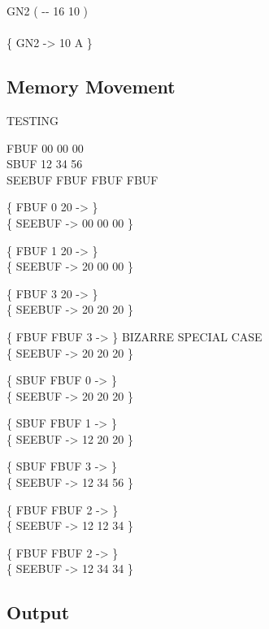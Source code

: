 \begin{tt}
\word{:} GN2	 ( -{}- 16 10 ) \\
\tab {}  
	  
	  
	  \word{!} \word{;} \\
\{ GN2 -> 10 A \}
\end{tt}

\subsection{Memory Movement}

\begin{tt}
TESTING  

 FBUF 00  00  00  \\
 SBUF 12  34  56  \\
\word{:} SEEBUF FBUF   FBUF    FBUF    \word{;}

\{ FBUF 0 20  -> \} \\
\{ SEEBUF -> 00 00 00 \}

\{ FBUF 1 20  -> \} \\
\{ SEEBUF -> 20 00 00 \}

\{ FBUF 3 20  -> \} \\
\{ SEEBUF -> 20 20 20 \}

\{ FBUF FBUF 3   -> \} \tab[3]  BIZARRE SPECIAL CASE \\
\{ SEEBUF -> 20 20 20 \}

\{ SBUF FBUF 0   -> \} \\
\{ SEEBUF -> 20 20 20 \}

\{ SBUF FBUF 1   -> \} \\
\{ SEEBUF -> 12 20 20 \}

\{ SBUF FBUF 3   -> \} \\
\{ SEEBUF -> 12 34 56 \}

\{ FBUF FBUF  2   -> \} \\
\{ SEEBUF -> 12 12 34 \}

\{ FBUF  FBUF 2   -> \} \\
\{ SEEBUF -> 12 34 34 \}
\end{tt}

\subsection{Output}

